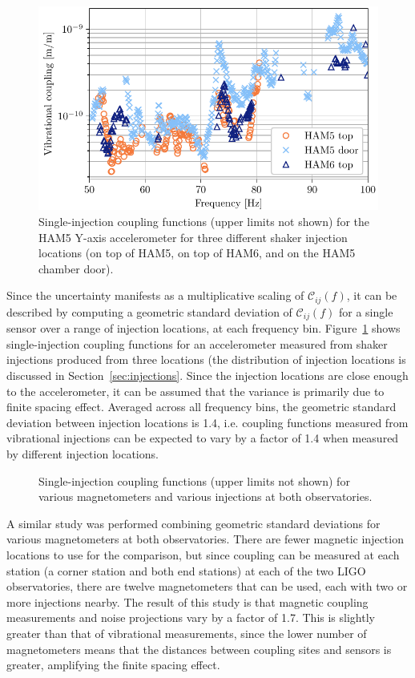 \begin{figure}[h!]
	\centering
	\includegraphics[width=\textwidth]{figures/cf-locations-vib.pdf}
	\caption{
		Single-injection coupling functions (upper limits not shown) for the HAM5 Y-axis accelerometer for three different shaker injection locations (on top of HAM5, on top of HAM6, and on the HAM5 chamber door).}
	\label{fig:cf-locations-vib}
\end{figure}

Since the uncertainty manifests as a multiplicative scaling of $\mathcal{C}_{ij}(f)$, it can be described by computing a geometric standard deviation of $\mathcal{C}_{ij}(f)$ for a single sensor over a range of injection locations, at each frequency bin.
Figure~\ref{fig:cf-locations-vib} shows single-injection coupling functions for an accelerometer measured from shaker injections produced from three locations (the distribution of injection locations is discussed in Section~\ref{sec:injections}.
Since the injection locations are close enough to the accelerometer, it can be assumed that the variance is primarily due to finite spacing effect.
Averaged across all frequency bins, the geometric standard deviation between injection locations is 1.4, i.e. coupling functions measured from vibrational injections can be expected to vary by a factor of 1.4 when measured by different injection locations.

\begin{figure}[h!]
	\centering
	\caption{
		Single-injection coupling functions (upper limits not shown) for various magnetometers and various injections at both observatories.}
	\label{fig:cf-locations-mag}
\end{figure}

A similar study was performed combining geometric standard deviations for various magnetometers at both observatories.
There are fewer magnetic injection locations to use for the comparison, but since coupling can be measured at each station (a corner station and both end stations) at each of the two LIGO observatories, there are twelve magnetometers that can be used, each with two or more injections nearby.
The result of this study is that magnetic coupling measurements and noise projections vary by a factor of 1.7.
This is slightly greater than that of vibrational measurements, since the lower number of magnetometers means that the distances between coupling sites and sensors is greater, amplifying the finite spacing effect.

